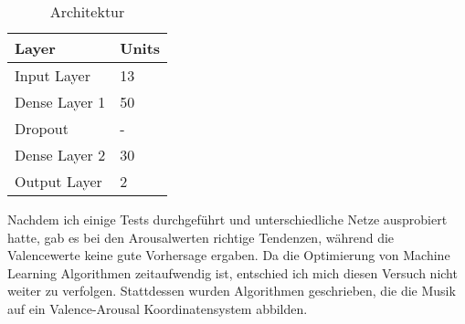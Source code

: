 \documentclass[11pt,a4paper]{article}
\begin{document}
\begin{table}[!ht]
\centering
\begin{tabular}{l | l}
\textbf{Layer} & \textbf{Units}\\
\hline
Input Layer & 13\\
Dense Layer 1 & 50\\
Dropout & -\\
Dense Layer 2 & 30\\
Output Layer & 2\\
\end{tabular}
\caption[Architektur]{Architektur}
\end{table}
\noindent
Nachdem ich einige Tests durchgeführt und unterschiedliche Netze ausprobiert hatte, gab es bei den Arousalwerten richtige Tendenzen, während die Valencewerte keine gute Vorhersage ergaben. Da die Optimierung von Machine Learning Algorithmen zeitaufwendig ist, entschied ich mich diesen Versuch nicht weiter zu verfolgen. Stattdessen wurden Algorithmen geschrieben, die die Musik auf ein Valence-Arousal Koordinatensystem abbilden.
\end{document}
